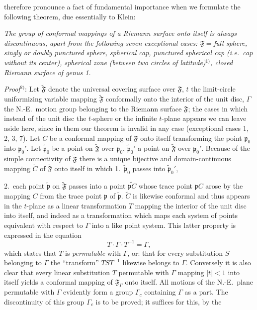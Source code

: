 \documentclass{article}
\begin{document}
therefore pronounce a fact of fundamental importance when we formulate the following theorem, due essentially to Klein:

\emph{The group of conformal mappings of a Riemann surface onto itself is always discontinuous, apart from the following seven exceptional cases: $\mathfrak{F} = {}$full sphere, singly or doubly punctured sphere, spherical cap, punctured spherical cap (i.e.\ cap without its center), spherical zone (between two circles of latitude)${}^{1)}$, closed Riemann surface of genus 1.}

\emph{Proof}${}^{2)}$: Let $\widetilde{\mathfrak{F}}$ denote the universal covering surface over $\mathfrak{F}$, $t$ the limit-circle uniformizing variable mapping $\widetilde{\mathfrak{F}}$ conformally onto the interior of the unit disc, $\varGamma$ the N.-E.\ motion group belonging to the Riemann surface $\mathfrak{F}$; the cases in which instead of the unit disc the $t$-sphere or the infinite $t$-plane appears we can leave aside here, since in them our theorem is invalid in any case (exceptional cases 1, 2, 3, 7). Let $C$ be a conformal mapping of $\mathfrak{F}$ onto itself transforming the point $\mathfrak{p}_0$ into $\mathfrak{p}_0'$. Let $\tilde{\mathfrak{p}}_0$ be a point on $\widetilde{\mathfrak{F}}$ over $\mathfrak{p}_0$, $\tilde{\mathfrak{p}}_0'$ a point on $\widetilde{\mathfrak{F}}$ over $\mathfrak{p}_0'$. Because of the simple connectivity of $\widetilde{\mathfrak{F}}$ there is a unique bijective and domain-continuous mapping $\widetilde{C}$ of $\widetilde{\mathfrak{F}}$ onto itself in which
1.~$\tilde{\mathfrak{p}}_0$ passes into $\tilde{\mathfrak{p}}_0'$,

2.~each point $\tilde{\mathfrak{p}}$ on $\widetilde{\mathfrak{F}}$ passes into a point $\widetilde{\mathfrak{p}C}$ whose trace point $\mathfrak{p}C$ arose by the mapping $C$ from the trace point $\mathfrak{p}$ of $\tilde{\mathfrak{p}}$.
$\widetilde{C}$ is likewise conformal and thus appears in the $t$-plane as a linear transformation $T$ mapping the interior of the unit disc into itself, and indeed as a transformation which maps each system of points equivalent with respect to $\varGamma$ into a like point system. This latter property is expressed in the equation
\[ T \cdot \varGamma \cdot T^{-1} = \varGamma, \]
which states that $T$ is \emph{permutable} with $\varGamma$, or: that for every substitution $S$ belonging to $\varGamma$ the ``transform'' $TST^{-1}$ likewise belongs to $\varGamma$. Conversely it is also clear that every linear substitution $T$ permutable with $\varGamma$ mapping $|t| < 1$ into itself yields a conformal mapping of $\mathfrak{F}_\varGamma$ onto itself. All motions of the N.-E.\ plane permutable with $\varGamma$ evidently form a group $\varGamma_c$ containing $\varGamma$ as a part. The discontinuity of this group $\varGamma_c$ is to be proved; it suffices for this, by the
\end{document}
